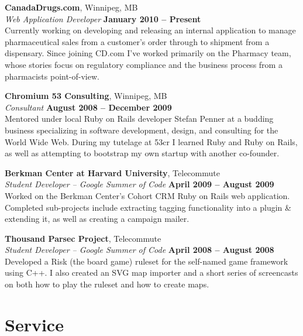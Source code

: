 \documentclass[margin,line,letterpaper]{resume}
\begin{document}
\begin{resume}
  {\bf CanadaDrugs.com}, Winnipeg, MB \vspace{2mm}\\\vspace{1mm}%
  {\sl Web Application Developer} \hfill {\bf January 2010 -- Present}\\
  Currently working on developing and releasing an internal application to manage pharmaceutical sales from a customer's order through to shipment from a dispensary. Since joining CD.com I've worked primarily on the Pharmacy team, whose stories focus on regulatory compliance and the business process from a pharmacists point-of-view.

  {\bf Chromium 53 Consulting}, Winnipeg, MB \vspace{2mm}\\\vspace{1mm}%
  {\sl Consultant} \hfill {\bf August 2008 -- December 2009}\\
  Mentored under local Ruby on Rails developer Stefan Penner at a budding business specializing in software development, design, and consulting for the World Wide Web. During my tutelage at 53cr I learned Ruby and Ruby on Rails, as well as attempting to bootstrap my own startup with another co-founder.

  {\bf Berkman Center at Harvard University}, Telecommute \vspace{2mm}\\\vspace{1mm}%
  {\sl Student Developer – Google Summer of Code} \hfill {\bf April 2009 -- August 2009}\\
  Worked on the Berkman Center’s Cohort CRM Ruby on Rails web application. Completed sub-projects include extracting tagging functionality into a plugin \& extending it, as well as creating a campaign mailer.

{\bf Thousand Parsec Project}, Telecommute \vspace{2mm}\\\vspace{1mm}%
  {\sl Student Developer --  Google Summer of Code } \hfill {\bf April 2008 -- August 2008}\\
  Developed a Risk (the board game) ruleset for the self-named game framework using C++. I also created an SVG map importer and a short series of screencasts on both how to play the ruleset and how to create maps.

  \section{\mysidestyle Service}


\end{resume}
\end{document}
